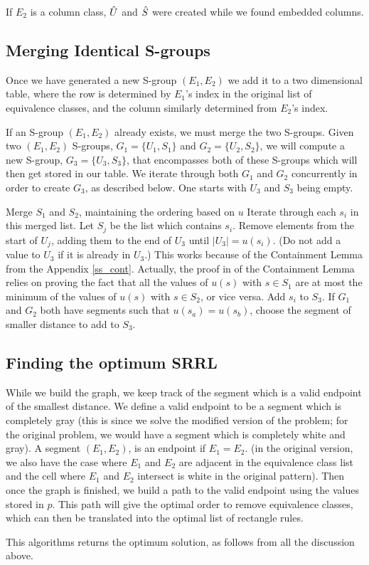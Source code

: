 If $E_2$ is a column class, $\hat{U}$ and $\hat{S}$
 were created while we found embedded columns.



\subsection{Merging Identical S-groups}

Once we have generated a new S-group $(E_1,E_2)$ we add it to a two dimensional table, where the row is determined by $E_1$'s index in the original list of equivalence classes, and the column similarly determined from $E_2$'s index.

If an S-group $(E_1,E_2)$ already exists, we must merge the two S-groups.
Given two $(E_1, E_2)$ S-groups, $G_1 = \{U_1,S_1\}$ and $G_2 = \{U_2,S_2\}$, we will compute a new S-group, $G_3 = \{U_3,S_3\}$, that encompasses both of these S-groups which will then get stored in our table.
We iterate through both $G_1$ and $G_2$ concurrently in order to create $G_3$,
as described below. One starts with $U_3$ and $S_3$ being empty.


Merge $S_1$ and $S_2$, maintaining the ordering based on $u$
Iterate through each $s_i$ in this merged list.
Let $S_j$ be the list which contains $s_i$.
Remove elements from the start of $U_j$,
adding them to the end of $U_3$ until $|U_3| = u(s_i)$.
(Do not add a value to $U_3$ if it is already in $U_3$.)
This works because of the Containment Lemma from the
 Appendix \ref{ss_cont}. Actually, the proof in \cite{ACJKLW07}
of the Containment Lemma relies on proving the fact that
 all the values of $u(s)$ with $s \in S_1$ are at most the minimum
of the values of $u(s)$ with $s \in S_2$, or vice versa.
Add $s_i$ to $S_3$.
If $G_1$ and $G_2$ both have segments such that $u(s_a) = u(s_b)$, choose the segment of smaller distance to add to $S_3$.

\subsection{Finding the optimum SRRL}

While we build the graph, we keep track of the segment which is a valid endpoint of the smallest distance.
We define a valid endpoint to be a segment which is completely gray
(this is since we solve the modified version of the problem;
for the original problem, we would have a segment which is completely
white and gray).
A segment $(E_1,E_2)$, is an endpoint if $E_1=E_2$.
(in the original version, we also have the case where
$E_1$ and $E_2$ are adjacent in the equivalence class list and
 the cell where $E_1$ and $E_2$ intersect is white in the original pattern).
Then once the graph is finished, we build a path to the valid endpoint using the values stored in $p$.
This path will give the optimal order to remove equivalence classes, which can then be translated into the optimal list of rectangle rules.

This algorithms returns the optimum solution, as follows from all the
discussion above.
